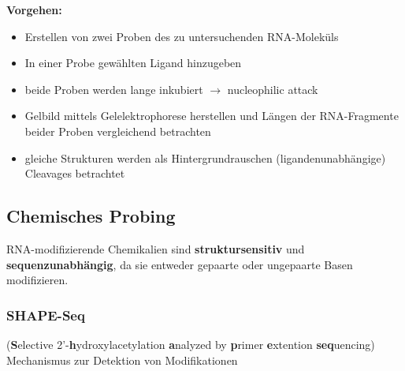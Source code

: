 \textbf{Vorgehen:}
\begin{itemize}
\item Erstellen von zwei Proben des zu untersuchenden RNA-Moleküls
\item In einer Probe gewählten Ligand hinzugeben
\item beide Proben werden lange inkubiert $\rightarrow$ nucleophilic attack
\item Gelbild mittels Gelelektrophorese herstellen und Längen der RNA-Fragmente beider Proben vergleichend betrachten
\item gleiche Strukturen werden als Hintergrundrauschen (ligandenunabhängige) Cleavages betrachtet
\end{itemize}

\subsection{Chemisches Probing}
RNA-modifizierende Chemikalien sind \textbf{struktursensitiv} und \textbf{sequenzunabhängig}, da sie entweder gepaarte oder ungepaarte Basen modifizieren.

\subsubsection{SHAPE-Seq}
(\textbf{S}elective 2'-\textbf{h}ydroxylacetylation \textbf{a}nalyzed by \textbf{p}rimer \textbf{e}xtention \textbf{seq}uencing) \\
Mechanismus zur Detektion von Modifikationen \\

